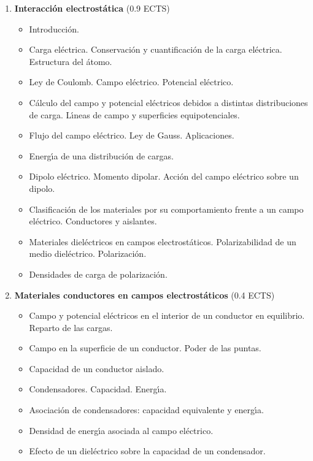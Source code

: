\begin{enumerate}[{\bf 1. }]
[{[\bf 1.] }]
\item {\bf Interacci\'{o}n electrost\'{a}tica}    \hfill (0.9 ECTS)
\begin{itemize} \addtolength{\itemsep}{-0.25\baselineskip}
\noindent
\item Introducci\'{o}n. %
\item Carga el\'{e}ctrica. Conservaci\'{o}n y cuantificaci\'{o}n de la carga
 el\'{e}ctrica. Estructura del \'{a}tomo.
\item Ley de Coulomb. Campo el\'{e}ctrico. Potencial el\'{e}ctrico.
\item C\'{a}lculo del campo y potencial el\'{e}ctricos debidos a distintas
 distribuciones de carga. L\'{\i}neas de campo y superficies equipotenciales.
\item  Flujo del campo el\'{e}ctrico. Ley de Gauss. Aplicaciones.
\item  Energ\'{\i}a de una distribuci\'{o}n de cargas.
\item Dipolo el\'{e}ctrico. Momento dipolar. 
Acci\'{o}n del campo el\'{e}ctrico sobre un dipolo.
\item Clasificaci\'{o}n de los materiales por su comportamiento frente a un
 campo el\'{e}ctrico. Conductores y aislantes.
\item Materiales diel\'{e}ctricos en campos electrost\'{a}ticos.
 Polarizabilidad de un medio diel\'{e}ctrico. Polarizaci\'{o}n.
\item  Densidades de carga de polarizaci\'{o}n.
\end{itemize}
%
%
\item {\bf Materiales conductores en campos electrost\'{a}ticos} \hfill (0.4 ECTS) 
\begin{itemize} \addtolength{\itemsep}{-0.25\baselineskip}
\item  Campo y potencial el\'{e}ctricos en el interior de un conductor en equilibrio. Reparto de las cargas.
\item  Campo en la superficie de un conductor. Poder de las puntas.
\item Capacidad de un conductor aislado.
\item Condensadores. Capacidad. Energ\'{\i}a.
\item  Asociaci\'{o}n de condensadores: capacidad equivalente y energ\'{\i}a.
\item Densidad de energ\'{\i}a asociada al campo el\'{e}ctrico.
\item  Efecto de un diel\'{e}ctrico sobre la capacidad de un condensador.


\end{itemize}
\end{enumerate}
